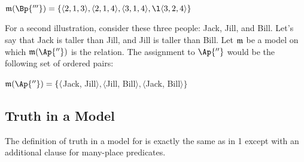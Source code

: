 \bigskip
\noindent{}$\IntA(\Bp{'''})=\{\langle 2, 1, 3\rangle, \langle 2, 1, 4\rangle, \langle 3, 1, 4\rangle, \l\langle 3, 2, 4\rangle\}$ 
\bigskip

For a second illustration, consider these three people: Jack, Jill, and Bill.  Let's say that Jack is taller than Jill, and Jill is taller than Bill.  Let $\mathfrak{m}$ be a model on which $\IntA(\Ap{''})$ is the  relation.  The assignment to $\Ap{''}$ would be the following set of ordered pairs:

\bigskip
\noindent{}$\IntA(\Ap{''})=\{\langle$Jack, Jill$\rangle, \langle$Jill, Bill$\rangle, \langle$Jack, Bill$\rangle\}$ 
\bigskip

\subsection{Truth in a Model}\label{GQL Truth in an Interpretation}

The definition of truth in a model for \GQL{} is exactly the same as in \GQL{}1 except with an additional clause for many-place predicates.

